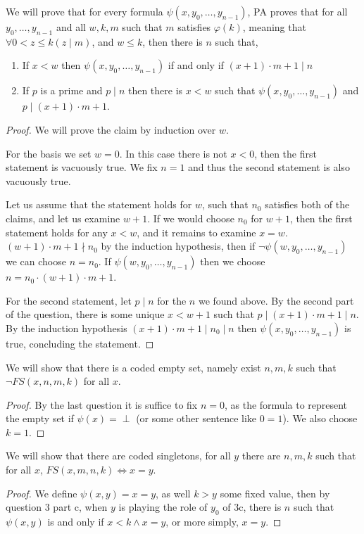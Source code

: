 \subquestion{}
We will prove that for every formula $\psi(x, y_0, \ldots, y_{n - 1})$, PA proves that for all $y_0, \ldots, y_{n - 1}$ and all $w, k, m$ such that $m$ satisfies $\varphi(k)$,
meaning that $\forall 0 < z \le k (z \mid m)$, and $w \le k$, then there is $n$ such that,
\begin{enumerate}
	\item If $x < w$ then $\psi(x, y_0, \ldots, y_{n - 1})$ if and only if $(x + 1) \cdot m + 1 \mid n$
	\item If $p$ is a prime and $p \mid n$ then there is $x < w$ such that $\psi(x, y_0, \ldots, y_{n - 1})$ and $p \mid (x + 1) \cdot m + 1$.
\end{enumerate}
\begin{proof}
	We will prove the claim by induction over $w$.

	For the basis we set $w = 0$.
	In this case there is not $x < 0$, then the first statement is vacuously true.
	We fix $n = 1$ and thus the second statement is also vacuously true.

	Let us assume that the statement holds for $w$, such that $n_0$ satisfies both of the claims, and let us examine $w + 1$.
	If we would choose $n_0$ for $w + 1$, then the first statement holds for any $x < w$, and it remains to examine $x = w$.
	$(w + 1) \cdot m + 1 \nmid n_0$ by the induction hypothesis, then if $\lnot \psi(w, y_0, \ldots, y_{n - 1})$ we can choose $n = n_0$.
	If $\psi(w, y_0, \ldots, y_{n - 1})$ then we choose $n = n_0 \cdot (w + 1) \cdot m + 1$.

	For the second statement, let $p \mid n$ for the $n$ we found above.
	By the second part of the question, there is some unique $x < w + 1$ such that $p \mid (x + 1) \cdot m + 1 \mid n$.
	By the induction hypothesis $(x + 1) \cdot m + 1 \mid n_0 \mid n$ then $\psi(x, y_0, \ldots, y_{n - 1})$ is true, concluding the statement.
\end{proof}

\question{}
\subquestion{}
We will show that there is a coded empty set, namely exist $n, m, k$ such that $\lnot FS(x, n, m, k)$ for all $x$.
\begin{proof}
	By the last question it is suffice to fix $n = 0$, as the formula to represent the empty set if $\psi(x) = \perp$ (or some other sentence like $0 = 1$).
	We also choose $k = 1$.
\end{proof}

\subquestion{}
We will show that there are coded singletons, for all $y$ there are $n, m, k$ such that for all $x$, $FS(x, m, n, k) \iff x = y$.
\begin{proof}
	We define $\psi(x, y) = x = y$, as well $k > y$ some fixed value, then by question 3 part c, when $y$ is playing the role of $y_0$ of 3c,
	there is $n$ such that $\psi(x, y)$ is and only if $x < k \land x = y $, or more simply, $x = y$.
\end{proof}

